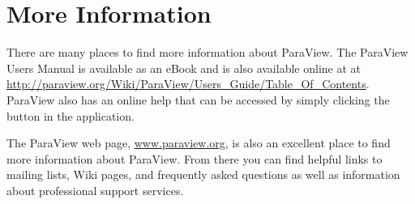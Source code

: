 \section{More Information}

There are many places to find more information about ParaView. The ParaView
Users Manual is available as an eBook and is also available online at at
\href{http://paraview.org/Wiki/ParaView/Users_Guide/Table_Of_Contents}{http://paraview.org/Wiki/ParaView/Users\_Guide/Table\_Of\_Contents}.
ParaView also has an online help that can be accessed by simply clicking
the  button in the application.

The ParaView web page, \href{http://www.paraview.org}{www.paraview.org}, is
also an excellent place to find more information about ParaView.  From
there you can find helpful links to mailing lists, Wiki pages, and
frequently asked questions as well as information about professional
support services.



